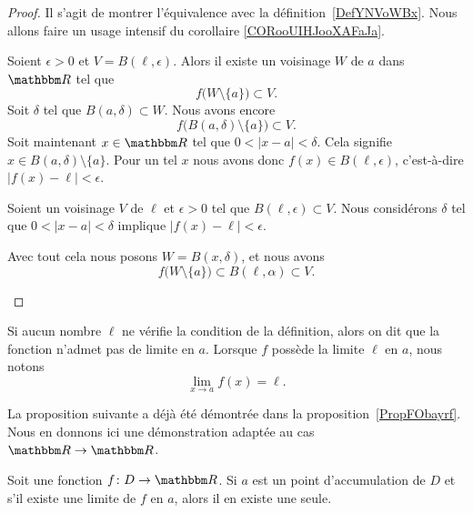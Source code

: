 \begin{proof}
    Il s'agit de montrer l'équivalence avec la définition~\ref{DefYNVoWBx}. Nous allons faire un usage intensif du corollaire \ref{CORooUIHJooXAFaJa}.
    \begin{subproof}
    \item[Sens direct]
        Soient \( \epsilon>0\) et \( V=B(\ell,\epsilon)\). Alors il existe un voisinage \( W\) de \( a\) dans \( \eR\) tel que
        \begin{equation}
            f\big( W\setminus\{ a \} \big)\subset V.
        \end{equation}
        Soit \( \delta\) tel que \( B(a,\delta)\subset W\). Nous avons encore
        \begin{equation}
            f\big( B(a,\delta)\setminus\{ a \} \big)\subset V.
        \end{equation}
        Soit maintenant \( x\in \eR\) tel que $0<| x-a |<\delta$. Cela signifie \( x\in B(a,\delta)\setminus\{ a \}\). Pour un tel \( x\) nous avons donc \( f(x)\in B(\ell,\epsilon)\), c'est-à-dire \( | f(x)-\ell |<\epsilon\).
    \item[Dans l'autre sens]
        Soient un voisinage \( V\) de \( \ell\) et \( \epsilon>0\) tel que \( B(\ell,\epsilon)\subset V\). Nous considérons \( \delta\) tel que \( 0<| x-a |<\delta\) implique \( | f(x)-\ell |<\epsilon\).

        Avec tout cela nous posons \( W=B(x,\delta)\), et nous avons
        \begin{equation}
            f\big( W\setminus\{ a \} \big)\subset B(\ell,\alpha)\subset V.
        \end{equation}
    \end{subproof}
\end{proof}

Si aucun nombre $\ell$ ne vérifie la condition de la définition, alors on dit que la fonction n'admet pas de limite en $a$. Lorsque $f$ possède la limite $\ell$ en $a$, nous notons
\begin{equation}
	\lim_{x\to a} f(x)=\ell.
\end{equation}

La proposition suivante a déjà été démontrée dans la proposition~\ref{PropFObayrf}. Nous en donnons ici une démonstration adaptée au cas \( \eR\to \eR\).

\begin{proposition}
	Soit une fonction $f\colon D\to \eR$. Si $a$ est un point d'accumulation de $D$ et s'il existe une limite de $f$ en $a$, alors il en existe une seule.
\end{proposition}


